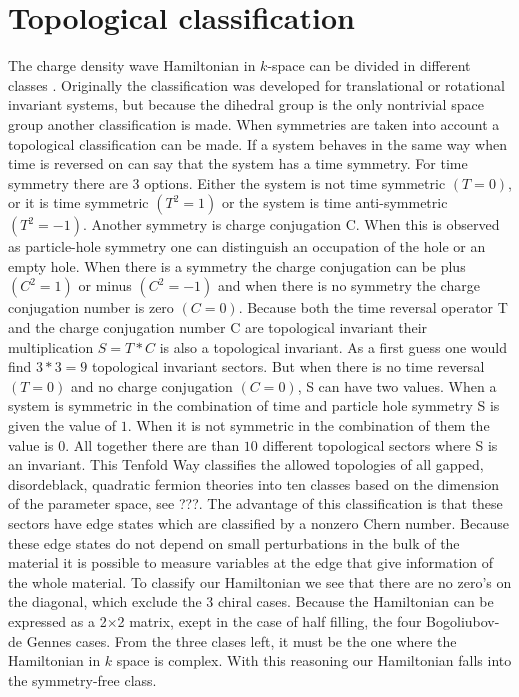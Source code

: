 \documentclass[letterpaper, 10 pt, conference]{ieeeconf}  %
\begin{document}
\section{Topological classification}

The charge density wave Hamiltonian in $k$-space can be divided in different
classes \cite{ryu2010}. Originally the classification was developed for translational or
rotational invariant systems, but because the dihedral group is the only
nontrivial space group another classification is made. When symmetries are taken
into account a topological classification can be made. If a system behaves in
the same way when time is reversed on can say that the system has a time
symmetry. For time symmetry there are 3 options. Either the system is not time
symmetric $(T=0)$, or it is time symmetric $(T^2=1)$ or the system is time
anti-symmetric  $(T^2=-1)$.  Another symmetry  is charge conjugation C. When
this is observed as particle-hole symmetry one can distinguish an occupation of
the hole or an empty hole. When there is a symmetry the  charge conjugation can
be plus $(C^2=1)$ or minus $(C^2=-1)$ and when there is no symmetry  the charge
conjugation number  is zero $(C=0)$.  Because both the time reversal operator T
and the charge conjugation number C are topological invariant their
multiplication $S=T * C $ is also a topological invariant. As a first guess one
would find $3 * 3 = 9 $ topological invariant sectors. But when there is no time
reversal $(T=0)$ and no charge conjugation $(C=0)$, S can have two values. When
a system is symmetric in the combination of time and particle hole symmetry S is
given the value of $1$. When it is not symmetric in the combination of them the
value is $0$. All together there are than $10$ different topological sectors
where S is an invariant. This Tenfold Way classifies the allowed topologies of
all gapped, disordeblack, quadratic fermion theories into ten classes based on the
dimension of the parameter space, see ???. The advantage of this classification is that
these sectors have edge states which are classified by a nonzero Chern number.
Because these edge states do not
depend on small perturbations in the bulk of the material it is possible to
measure variables at the edge that give information of the whole material.
To classify our Hamiltonian we see that there are no zero's on the diagonal,
which exclude the 3 chiral cases. Because the Hamiltonian can be expressed as a 2$\times$2
 matrix, exept in the case of half filling, the four Bogoliubov-de Gennes cases. From the three
 clases left, it must be the one where the Hamiltonian in $k$ space is complex.
 With this reasoning our Hamiltonian falls into the symmetry-free class.
\end{document}
